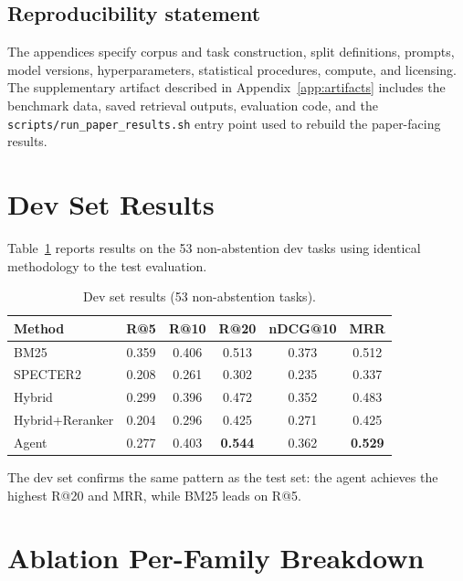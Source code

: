 \documentclass{article}
\begin{document}
\subsection*{Reproducibility statement}
The appendices specify corpus and task construction, split definitions, prompts, model versions, hyperparameters, statistical procedures, compute, and licensing. The supplementary artifact described in Appendix~\ref{app:artifacts} includes the benchmark data, saved retrieval outputs, evaluation code, and the \texttt{scripts/run\_paper\_results.sh} entry point used to rebuild the paper-facing results.




\newpage
\appendix

\section{Dev Set Results}
\label{app:dev}

Table~\ref{tab:dev} reports results on the 53 non-abstention dev tasks using identical methodology to the test evaluation.

\begin{table}[ht]
\centering
\caption{Dev set results (53 non-abstention tasks).}
\begin{tabular}{lccccc}
\toprule
\textbf{Method} & \textbf{R@5} & \textbf{R@10} & \textbf{R@20} & \textbf{nDCG@10} & \textbf{MRR} \\
\midrule
BM25 & 0.359 & 0.406 & 0.513 & 0.373 & 0.512 \\
SPECTER2 & 0.208 & 0.261 & 0.302 & 0.235 & 0.337 \\
Hybrid & 0.299 & 0.396 & 0.472 & 0.352 & 0.483 \\
Hybrid+Reranker & 0.204 & 0.296 & 0.425 & 0.271 & 0.425 \\
Agent & 0.277 & 0.403 & \textbf{0.544} & 0.362 & \textbf{0.529} \\
\bottomrule
\end{tabular}
\label{tab:dev}
\end{table}

The dev set confirms the same pattern as the test set: the agent achieves the highest R@20 and MRR, while BM25 leads on R@5.

\section{Ablation Per-Family Breakdown}
\label{app:ablation_family}
\end{document}

